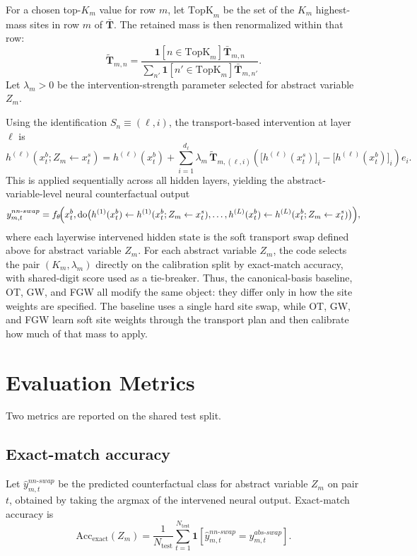 \documentclass[11pt]{article}
\newcommand{\Tplan}{\mathbf{T}}
\begin{document}
For a chosen top-$K_m$ value for row $m$, let $\mathrm{TopK}_m$ be the set of the $K_m$ highest-mass sites in row $m$ of $\bar{\Tplan}$. The retained mass is then renormalized within that row:
\[
\widetilde{\Tplan}_{m,n}
=
\frac{\mathbf{1}[n \in \mathrm{TopK}_m]\bar{\Tplan}_{m,n}}
{\sum_{n'} \mathbf{1}[n' \in \mathrm{TopK}_m]\bar{\Tplan}_{m,n'}}.
\]
Let $\lambda_m > 0$ be the intervention-strength parameter selected for abstract variable $Z_m$.

Using the identification $S_n \equiv (\ell,i)$, the transport-based intervention at layer $\ell$ is
\[
h^{(\ell)}(x_t^b; Z_m \leftarrow x_t^s)
=
h^{(\ell)}(x_t^b)
+
\sum_{i=1}^{d_\ell}
\lambda_m \,
\widetilde{\Tplan}_{m,(\ell,i)}
\left(
\bigl[h^{(\ell)}(x_t^s)\bigr]_i - \bigl[h^{(\ell)}(x_t^b)\bigr]_i
\right)e_i.
\]
This is applied sequentially across all hidden layers, yielding the abstract-variable-level neural counterfactual output
\[
y_{m,t}^{nn\text{-}swap}
=
f_\theta\!\Bigl(
x_t^b,
\mathrm{do}\bigl(
h^{(1)}(x_t^b) \leftarrow h^{(1)}(x_t^b; Z_m \leftarrow x_t^s), \dots,
h^{(L)}(x_t^b) \leftarrow h^{(L)}(x_t^b; Z_m \leftarrow x_t^s)
\bigr)
\Bigr),
\]
where each layerwise intervened hidden state is the soft transport swap defined above for abstract variable $Z_m$.
For each abstract variable $Z_m$, the code selects the pair $(K_m,\lambda_m)$ directly on the calibration split by exact-match accuracy, with shared-digit score used as a tie-breaker. Thus, the canonical-basis baseline, OT, GW, and FGW all modify the same object: they differ only in how the site weights are specified. The baseline uses a single hard site swap, while OT, GW, and FGW learn soft site weights through the transport plan and then calibrate how much of that mass to apply.

\section{Evaluation Metrics}
Two metrics are reported on the shared test split.

\subsection{Exact-match accuracy}
Let $\widehat{y}_{m,t}^{nn\text{-}swap}$ be the predicted counterfactual class for abstract variable $Z_m$ on pair $t$, obtained by taking the argmax of the intervened neural output. Exact-match accuracy is
\[
\mathrm{Acc}_{\mathrm{exact}}(Z_m)
=
\frac{1}{N_{\mathrm{test}}}
\sum_{t=1}^{N_{\mathrm{test}}}
\mathbf{1}\!\left[\widehat{y}_{m,t}^{nn\text{-}swap} = y_{m,t}^{abs\text{-}swap}\right].
\]
\end{document}
